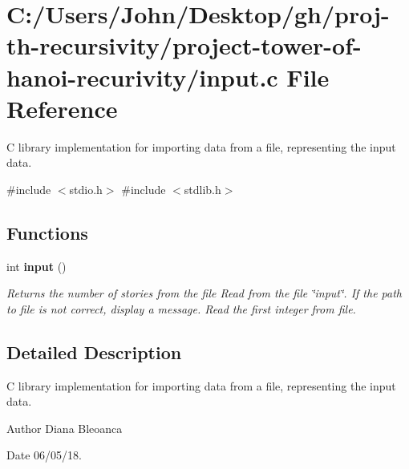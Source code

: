 \section{C\+:/\+Users/\+John/\+Desktop/gh/proj-\/th-\/recursivity/project-\/tower-\/of-\/hanoi-\/recurivity/input.c File Reference}
\label{input_8c}


C library implementation for importing data from a file, representing the input data.  


{\ttfamily \#include $<$stdio.\+h$>$}\newline
{\ttfamily \#include $<$stdlib.\+h$>$}\newline
\subsection*{Functions}
\begin{DoxyCompactItemize}
\item 
\mbox{\label{input_8c_ac3bdbc826d19fb41ffb25470527c3801}} 
int \textbf{ input} ()
\begin{DoxyCompactList}\small\item\em Returns the number of stories from the file Read from the file \char`\"{}input\char`\"{}. If the path to file is not correct, display a message. Read the first integer from file. \end{DoxyCompactList}\end{DoxyCompactItemize}


\subsection{Detailed Description}
C library implementation for importing data from a file, representing the input data. 

\begin{DoxyAuthor}{Author}
Diana Bleoanca 
\end{DoxyAuthor}
\begin{DoxyDate}{Date}
06/05/18. 
\end{DoxyDate}
